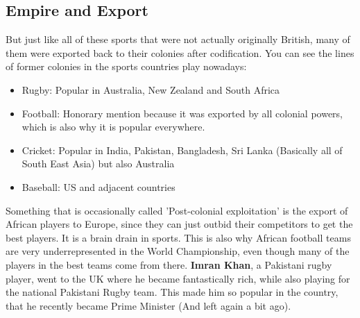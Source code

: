 \documentclass{article}
\begin{document}
	\subsection{Empire and Export}
	But just like all of these sports that were not actually originally British, many of them were exported back to their colonies after codification.
	You can see the lines of former colonies in the sports countries play nowadays:
	\begin{itemize}
		\item{Rugby: Popular in Australia, New Zealand and South Africa}
		\item{Football: Honorary mention because it was exported by all colonial powers, which is also why it is popular everywhere.}
		\item{Cricket: Popular in India, Pakistan, Bangladesh, Sri Lanka (Basically all of South East Asia) but also Australia}
		\item{Baseball: US and adjacent countries}
	\end{itemize}
	Something that is occasionally called 'Post-colonial exploitation' is the export of African players to Europe, since they can just outbid their competitors to get the best players. It is a brain drain in sports. This is also why African football teams are very underrepresented in the World Championship, even though many of the players in the best teams come from there. \textbf{Imran Khan}, a Pakistani rugby player, went to the UK where he became fantastically rich, while also playing for the national Pakistani Rugby team. This made him so popular in the country, that he recently became Prime Minister (And left again a bit ago). \\
\end{document}
